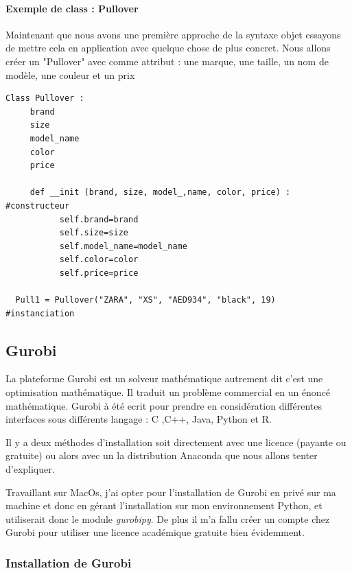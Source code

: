 \documentclass[a4paper, 12pt, twoside]{article}
\begin{document}
\paragraph{Exemple de class : Pullover}{Maintenant que nous avons une première approche de la syntaxe objet essayons de mettre cela en application avec quelque chose de plus concret. Nous allons créer un "Pullover" avec comme attribut : une marque, une taille, un nom de modèle, une couleur et un prix }
\begin{verbatim}
Class Pullover : 
     brand
     size
     model_name
     color
     price
   
     def __init (brand, size, model_,name, color, price) :       #constructeur
           self.brand=brand
           self.size=size
           self.model_name=model_name
           self.color=color
           self.price=price
          
  Pull1 = Pullover("ZARA", "XS", "AED934", "black", 19)         #instanciation  
\end{verbatim}
\newpage
\subsection{Gurobi}
La plateforme Gurobi est un solveur mathématique autrement dit c'est une optimisation mathématique. Il traduit un problème commercial en un énoncé mathématique. Gurobi à été ecrit pour prendre en considération différentes interfaces sous différents langage : \textsf{C ,C++, Java, Python et R}. \newline

Il y a deux méthodes d'installation soit directement avec une licence (payante ou gratuite) ou alors avec un la distribution \textsf{Anaconda} que nous allons tenter d'expliquer. \newline

Travaillant sur MacOs, j'ai opter pour l'installation de \textsf{Gurobi} en privé sur ma machine et donc en gérant l'installation sur mon environnement Python, et utiliserait donc le module \emph{gurobipy}. De plus il m'a fallu créer un compte chez \textsf{Gurobi} pour utiliser une licence académique gratuite bien évidemment. 

\subsubsection{Installation de Gurobi}
\end{document}

